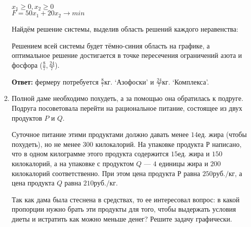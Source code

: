 \documentclass[12pt]{article}
\begin{document}
\begin{enumerate}
\begin{center}
$x_1\ge0, x_2\ge0$\\
$F=50x_1+20x_2 \rightarrow min$\\
\end{center}
\newpage
Найдём решение системы, выделив область решений каждого неравенства:
\begin{center}
\end{center}
Решением всей системы будет тёмно-синия область на графике, а оптимальное решение достигается в точке пересечения ограничений азота и фосфора ($\frac{8}{7},\frac{24}{7}$).

\textbf{Ответ:} фермеру потребуется $\frac{8}{7}кг.$ \lq{}Азофоски\rq{}  и $\frac{24}{7}кг.$ \lq{}Комплекса\rq{}.
\newpage
\item Полной даме необходимо похудеть, а за помощью она обратилась к подруге. Подруга посоветовала перейти на рациональное питание, состоящее из двух продуктов $P$ и $Q$. 

Суточное питание этими продуктами должно давать менее $14ед.$ жира (чтобы похудеть), но не менее $300$ килокалорий. На упаковке продукта $Р$ написано, что в одном килограмме этого продукта содержится $15ед.$ жира и $150$ килокалорий, а на упаковке с продуктом $Q$ --- $4$ единицы жира и $200$ килокалорий соответственно. При этом цена продукта $Р$ равна $250 руб./кг$, а цена продукта $Q$ равна $210 руб./кг$.

Так как дама была стеснена в средствах, то ее интересовал вопрос: в какой пропорции нужно брать эти продукты для того, чтобы выдержать условия диеты и истратить как можно меньше денег? Решите задачу графически. 


\end{enumerate}
\end{document}
